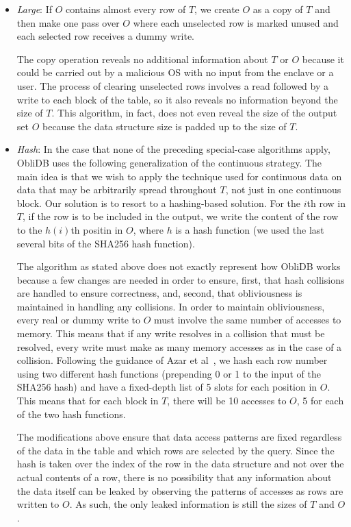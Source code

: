 \documentclass[letterpaper,twocolumn,10pt]{article}
\def\name/{ObliDB}
\begin{document}
\begin{itemize}[itemsep=0pt,parsep=0pt]
\item \textit{Large}: If $O$ contains almost every row of $T$, we create $O$ as a copy of $T$ and then make one pass over $O$ where each unselected row is marked unused and each selected row receives a dummy write. 

The copy operation reveals no additional information about $T$ or $O$ because it could be carried out by a malicious OS with no input from the enclave or a user. The process of clearing unselected rows involves a read followed by a write to each block of the table, so it also reveals no information beyond the size of $T$. This algorithm, in fact, does not even reveal the size of the output set $O$ because the data structure size is padded up to the size of $T$. 

\item \textit{Hash}: In the case that none of the preceding special-case algorithms apply, \name/ uses the following generalization of the continuous strategy. The main idea is that we wish to apply the technique used for continuous data on data that may be arbitrarily spread throughout $T$, not just in one continuous block. Our solution is to resort to a hashing-based solution. For the $i$th row in $T$, if the row is to be included in the output, we write the content of the row to the $h(i)$th positin in $O$, where $h$ is a hash function (we used the last several bits of the SHA256 hash function).

The algorithm as stated above does not exactly represent how \name/ works because a few changes are needed in order to ensure, first, that hash collisions are handled to ensure correctness, and, second, that obliviousness is maintained in handling any collisions. In order to maintain obliviousness, every real or dummy write to $O$ must involve the same number of accesses to memory. This means that if any write resolves in a collision that must be resolved, every write must make as many memory accesses as in the case of a collision. Following the guidance of Azar et al~\cite{ABKU99}, we hash each row number using two different hash functions (prepending 0 or 1 to the input of the SHA256 hash) and have a fixed-depth list of 5 slots for each position in $O$. This means that for each block in $T$, there will be 10 accesses to $O$, 5 for each of the two hash functions. 

The modifications above ensure that data access patterns are fixed regardless of the data in the table and which rows are selected by the query. Since the hash is taken over the index of the row in the data structure and not over the actual contents of a row, there is no possibility that any information about the data itself can be leaked by observing the patterns of accesses as rows are written to $O$. As such, the only leaked information is still the sizes of $T$ and $O$. 


\end{itemize}
\end{document}
